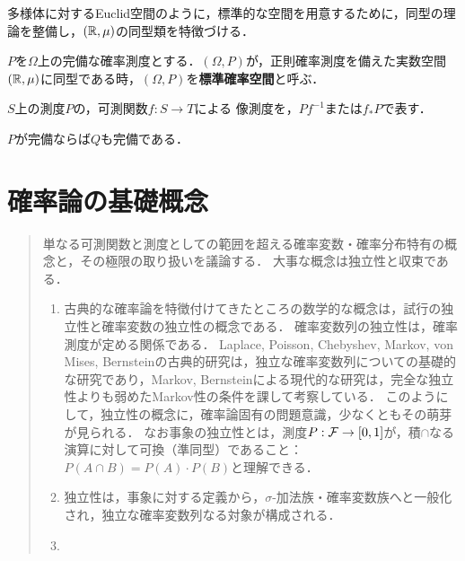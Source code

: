\documentclass[uplatex,dvipdfmx]{jsreport}
\begin{document}
\begin{tcolorbox}[colframe=ForestGreen, colback=ForestGreen!10!white,breakable,colbacktitle=ForestGreen!40!white,coltitle=black,fonttitle=\bfseries\sffamily,
title=]
    多様体に対するEuclid空間のように，標準的な空間を用意するために，同型の理論を整備し，$(\mathbb{R},\mu)$の同型類を特徴づける．
\end{tcolorbox}

\begin{definition}\label{def-canonical-measure}
    $P$を$\Omega$上の完備な確率測度とする．$(\Omega,P)$が，正則確率測度を備えた実数空間$(\mathbb{R},\mu)$に同型である時，$(\Omega,P)$を\textbf{標準確率空間}と呼ぶ．
\end{definition}

\begin{definition}
    $S$上の測度$P$の，可測関数$f:S\to T$による
    像測度を，$Pf^{-1}$または$f_*P$で表す．
\end{definition}

\begin{lemma}
    $P$が完備ならば$Q$も完備である．
\end{lemma}

\chapter{確率論の基礎概念}

\begin{quotation}
    単なる可測関数と測度としての範囲を超える確率変数・確率分布特有の概念と，その極限の取り扱いを議論する．
    大事な概念は独立性と収束である．
    \begin{enumerate}
        \item 古典的な確率論を特徴付けてきたところの数学的な概念は，試行の独立性と確率変数の独立性の概念である．
        確率変数列の独立性は，確率測度が定める関係である．
        Laplace, Poisson, Chebyshev, Markov, von Mises, Bernsteinの古典的研究は，独立な確率変数列についての基礎的な研究であり，Markov, Bernsteinによる現代的な研究は，完全な独立性よりも弱めたMarkov性の条件を課して考察している．
        このようにして，独立性の概念に，確率論固有の問題意識，少なくともその萌芽が見られる\cite{Kolmogorov}．
        なお事象の独立性とは，測度$P:\mathcal{F}\to[0,1]$が，積$\cap$なる演算に対して可換（準同型）であること：$P(A\cap B)=P(A)\cdot P(B)$と理解できる．
        \item 独立性は，事象に対する定義から，$\sigma$-加法族・確率変数族へと一般化され，独立な確率変数列なる対象が構成される．
        \item 
    \end{enumerate}
\end{quotation}
\end{document}
